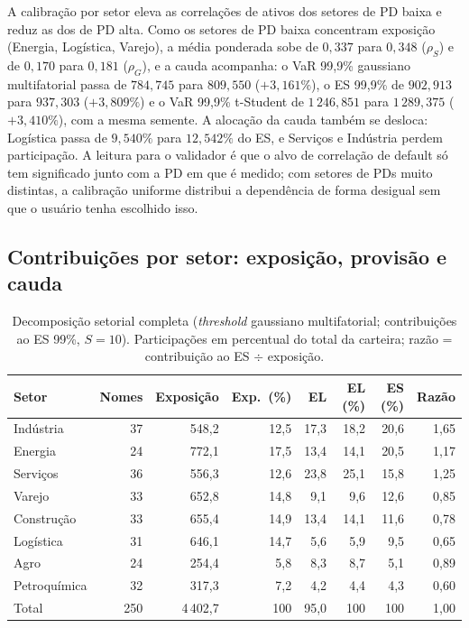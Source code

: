 \documentclass[11pt,a4paper]{article}
\begin{document}
A calibração por setor eleva as correlações de ativos dos setores de PD baixa e reduz as dos de PD alta. Como os setores de PD baixa concentram exposição (Energia, Logística, Varejo), a média ponderada sobe de $0{,}337$ para $0{,}348$ ($\rho_S$) e de $0{,}170$ para $0{,}181$ ($\rho_G$), e a cauda acompanha: o VaR 99{,}9\% gaussiano multifatorial passa de $784{,}745$ para $809{,}550$ ($+3{,}161\%$), o ES 99{,}9\% de $902{,}913$ para $937{,}303$ ($+3{,}809\%$) e o VaR 99{,}9\% t-Student de $1\,246{,}851$ para $1\,289{,}375$ ($+3{,}410\%$), com a mesma semente. A alocação da cauda também se desloca: Logística passa de $9{,}540\%$ para $12{,}542\%$ do ES, e Serviços e Indústria perdem participação. A leitura para o validador é que o alvo de correlação de default só tem significado junto com a PD em que é medido; com setores de PDs muito distintas, a calibração uniforme distribui a dependência de forma desigual sem que o usuário tenha escolhido isso.

\subsection{Contribuições por setor: exposição, provisão e cauda}
\label{sec:setores-ex}

\begin{table}[htb]
\centering\small
\caption{Decomposição setorial completa (\emph{threshold} gaussiano multifatorial; contribuições ao ES 99\%, $S=10$). Participações em percentual do total da carteira; razão = contribuição ao ES $\div$ exposição.}
\label{tab:setores}
\setlength{\tabcolsep}{4.5pt}
\begin{tabular}{lrrrrrrr}
\toprule
Setor & Nomes & Exposição & Exp.\ (\%) & EL & EL (\%) & ES (\%) & Razão \\
\midrule
Indústria    & 37 & 548{,}2 & 12{,}5 & 17{,}3 & 18{,}2 & 20{,}6 & 1{,}65 \\
Energia      & 24 & 772{,}1 & 17{,}5 & 13{,}4 & 14{,}1 & 20{,}5 & 1{,}17 \\
Serviços     & 36 & 556{,}3 & 12{,}6 & 23{,}8 & 25{,}1 & 15{,}8 & 1{,}25 \\
Varejo       & 33 & 652{,}8 & 14{,}8 & 9{,}1  & 9{,}6  & 12{,}6 & 0{,}85 \\
Construção   & 33 & 655{,}4 & 14{,}9 & 13{,}4 & 14{,}1 & 11{,}6 & 0{,}78 \\
Logística    & 31 & 646{,}1 & 14{,}7 & 5{,}6  & 5{,}9  & 9{,}5  & 0{,}65 \\
Agro         & 24 & 254{,}4 & 5{,}8  & 8{,}3  & 8{,}7  & 5{,}1  & 0{,}89 \\
Petroquímica & 32 & 317{,}3 & 7{,}2  & 4{,}2  & 4{,}4  & 4{,}3  & 0{,}60 \\
\midrule
Total & 250 & 4\,402{,}7 & 100 & 95{,}0 & 100 & 100 & 1{,}00 \\
\bottomrule
\end{tabular}
\end{table}
\end{document}
